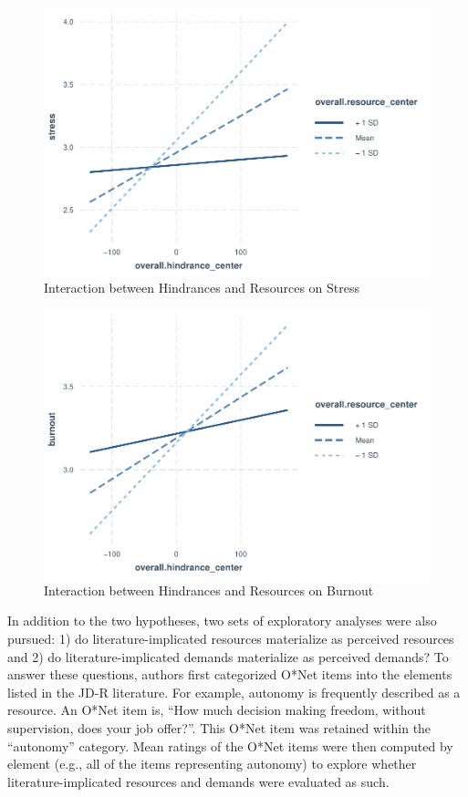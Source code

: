 \documentclass[
  man,mask]{apa7}
\begin{document}
\begin{figure}
\centering
\includegraphics{Submission_files/figure-latex/hind-resource-stress-int-1.pdf}
\caption{\label{fig:hind-resource-stress-int}Interaction between Hindrances and Resources on Stress}
\end{figure}

\begin{figure}
\centering
\includegraphics{Submission_files/figure-latex/hind-resource-burn-int-1.pdf}
\caption{\label{fig:hind-resource-burn-int}Interaction between Hindrances and Resources on Burnout}
\end{figure}

In addition to the two hypotheses, two sets of exploratory analyses were also pursued: 1) do literature-implicated resources materialize as perceived resources and 2) do literature-implicated demands materialize as perceived demands? To answer these questions, authors first categorized O*Net items into the elements listed in the JD-R literature. For example, autonomy is frequently described as a resource. An O*Net item is, ``How much decision making freedom, without supervision, does your job offer?''. This O*Net item was retained within the ``autonomy'' category. Mean ratings of the O*Net items were then computed by element (e.g., all of the items representing autonomy) to explore whether literature-implicated resources and demands were evaluated as such.
\end{document}
